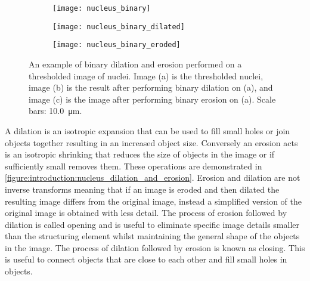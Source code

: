 \begin{figure}[htbp!]\centering
	\begin{subfigure}[b]{0.32\linewidth}
		\centering
		\texttt{[image: nucleus\_binary]}
		\caption{}
		\label{figure:introduction:nucleus_binary}
	\end{subfigure}
	\begin{subfigure}[b]{0.32\linewidth}
		\centering
		\texttt{[image: nucleus\_binary\_dilated]}
		\caption{}
		\label{figure:introduction:nucleus_dilated}
	\end{subfigure}
	\begin{subfigure}[b]{0.32\linewidth}
		\centering
		\texttt{[image: nucleus\_binary\_eroded]}
		\caption{}
		\label{figure:introduction:nucleus_erosion}
	\end{subfigure}
\caption[Binary dilation and erosion]{An example of binary dilation and erosion performed on a thresholded image of nuclei. Image (a) is the thresholded nuclei, image (b) is the result after performing binary dilation on (a), and image (c) is the image after performing binary erosion on (a). Scale bars: \SI{10.0}{\micro\meter}.}
\label{figure:introduction:nucleus_dilation_and_erosion}
\end{figure}

A dilation is an isotropic expansion that can be used to fill small holes or join objects together resulting in an increased object size. Conversely an erosion acts is an isotropic shrinking that reduces the size of objects in the image or if sufficiently small removes them. These operations are demonstrated in \autoref{figure:introduction:nucleus_dilation_and_erosion}. Erosion and dilation are not inverse transforms meaning that if an image is eroded and then dilated the resulting image differs from the original image, instead a simplified version of the original image is obtained with less detail. The process of erosion followed by dilation is called opening and is useful to eliminate specific image details smaller than the structuring element whilst maintaining the general shape of the objects in the image. The process of dilation followed by erosion is known as closing. This is useful to connect objects that are close to each other and fill small holes in objects.

